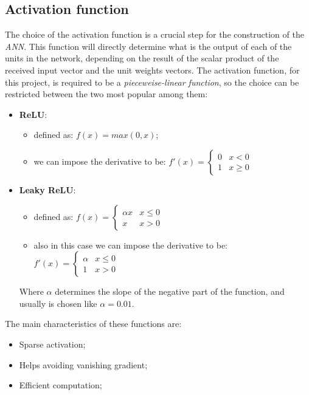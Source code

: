 \subsection{Activation function}
The choice of the activation function is a crucial step for the construction of the \textit{ANN}. This function will directly determine what is the output of each of the units in the network, depending on the result of the scalar product of the received input vector and the unit weights vectors.\newline
The activation function, for this project, is required to be a \textit{pieceweise-linear function}, so the choice can be restricted between the two most popular among them:
\begin{itemize}
    \item \textbf{ReLU}:
        \begin{itemize}
            \item defined as: $f(x) = max(0,x)$;
            \item we can impose the derivative to be:
            $f'(x) = \begin{cases} 
                0 & x<0 \\
                1 & x\geq 0 
                \end{cases}$
        \end{itemize}
    \item \textbf{Leaky ReLU}:
        \begin{itemize}
            \item defined as:
            $f(x) = \begin{cases}
                \alpha x & x\leq 0 \\
                x & x>0
            \end{cases}$
            \item also in this case we can impose the derivative to be:
            $f'(x) = \begin{cases}
                \alpha & x\leq0 \\
                1 & x>0
            \end{cases}$
        \end{itemize}
        Where $\alpha$ determines the slope of the negative part of the function, and usually is chosen like $\alpha=0.01$.\newline
\end{itemize}
The main characteristics of these functions are:
\begin{itemize}
    \item Sparse activation;
    \item Helps avoiding vanishing gradient;
    \item Efficient computation;
\end{itemize}
